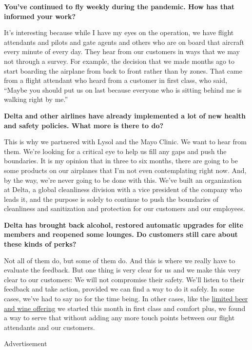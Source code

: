 \textbf{You've continued to fly weekly during the pandemic. How has that
informed your work?}

It's interesting because while I have my eyes on the operation, we have
flight attendants and pilots and gate agents and others who are on board
that aircraft every minute of every day. They hear from our customers in
ways that we may not through a survey. For example, the decision that we
made months ago to start boarding the airplane from back to front rather
than by zones. That came from a flight attendant who heard from a
customer in first class, who said, ``Maybe you should put us on last
because everyone who is sitting behind me is walking right by me.''

\textbf{Delta and other airlines have already implemented a lot of new
health and safety policies. What more is there to do?}

This is why we partnered with Lysol and the Mayo Clinic. We want to hear
from them. We're looking for a critical eye to help us fill any gaps and
push the boundaries. It is my opinion that in three to six months, there
are going to be some products on our airplanes that I'm not even
contemplating right now. And, by the way, we're never going to be done
with this. We've built an organization at Delta, a global cleanliness
division with a vice president of the company who leads it, and the
purpose is solely to continue to push the boundaries of cleanliness and
sanitization and protection for our customers and our employees.

\textbf{Delta has brought back alcohol, restored automatic upgrades for
elite members and reopened some lounges. Do customers still care about
these kinds of perks?}

Not all of them do, but some of them do. And this is where we really
have to evaluate the feedback. But one thing is very clear for us and we
make this very clear to our customers: We will not compromise their
safety. We'll listen to their feedback and take action, provided we can
find a way to do it safely. In some cases, we've had to say no for the
time being. In other cases, like the
\href{https://news.delta.com/beverage-service-returns-delta-reintroduces-select-beer-and-wine-domestic-flights-added-safety}{limited
beer and wine offering} we started this month in first class and comfort
plus, we found a way to serve that without adding any more touch points
between our flight attendants and our customers.

Advertisement

